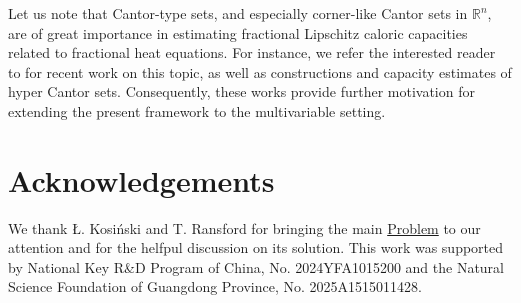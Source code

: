 \documentclass[12pt]{amsart}
\theoremstyle{definition}\newtheorem{remark}[theorem]{Remark}
\theoremstyle{definition}\newtheorem{example}[theorem]{Example}
\theoremstyle{definition}\newtheorem{definition}{Definition}
\numberwithin{equation}{section}
\newcommand\RR{{\mathbb R}}
\begin{document}
Let us note that Cantor-type sets, and especially corner-like Cantor sets in $\RR^n$, are of great importance in estimating fractional Lipschitz caloric capacities related to fractional heat equations. For instance, we refer the interested reader to \cite{Hernandez1, Hernandez2} for recent work on this topic, as well as constructions and capacity estimates of hyper Cantor sets. Consequently, these works provide further motivation for extending the present framework to the multivariable setting.
 


\section*{Acknowledgements}
We thank \L. Kosi\'{n}ski and T. Ransford for bringing the main \hyperref[Problem]{Problem} to our attention and for the helfpul discussion on its solution. This work was supported by National Key R\&D Program of China, No. 2024YFA1015200 and the Natural Science Foundation of Guangdong Province, No. 2025A1515011428.
\end{document}
